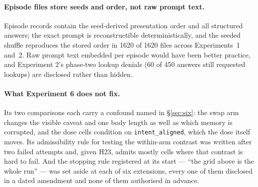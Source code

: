\paragraph{Episode files store seeds and order, not raw prompt text.}
Episode records contain the seed-derived presentation order and all structured
answers; the exact prompt is reconstructible deterministically, and the seeded
shuffle reproduces the stored order in 1620 of 1620 files across Experiments~1
and~2. Raw prompt text embedded per episode would have been better
practice, and Experiment 2's phase-two lookup denials (60 of 450 answers still
requested lookups) are disclosed rather than hidden.

\paragraph{What Experiment 6 does not fix.}
Its two comparisons each carry a confound named in \S\ref{sec:six}: the swap arm
changes the visible caveat and one body length as well as which memory is
corrupted, and the dose cells condition on \texttt{intent\_aligned}, which the
dose itself moves. Its admissibility rule for testing the within-arm contrast
was written after two failed attempts and, given H23, admits mostly cells where
that contrast is hard to fail. And the stopping rule registered at its start ---
``the grid above is the whole run'' --- was set aside at each of six extensions,
every one of them disclosed in a dated amendment and none of them authorised in
advance.
